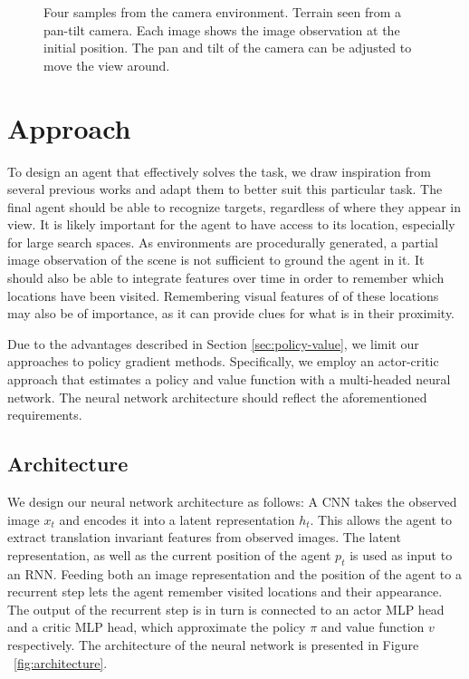 \begin{figure}
    \centering
    
    \caption[Camera environment]{Four samples from the camera environment. Terrain seen from a pan-tilt camera. Each image shows the image observation at the initial position. The pan and tilt of the camera can be adjusted to move the view around.}
    \label{fig:camera}
\end{figure}

\section{Approach}
\label{sec:approach}

To design an agent that effectively solves the task, we draw inspiration from several previous works and adapt them to better suit this particular task.
The final agent should be able to recognize targets, regardless of where they appear in view.
It is likely important for the agent to have access to its location, especially for large search spaces.
As environments are procedurally generated, a partial image observation of the scene is not sufficient to ground the agent in it.
It should also be able to integrate features over time in order to remember which locations have been visited.
Remembering visual features of of these locations may also be of importance, as it can provide clues for what is in their proximity.

Due to the advantages described in Section \ref{sec:policy-value}, we limit our approaches to policy gradient methods.
Specifically, we employ an actor-critic approach that estimates a policy and value function with a multi-headed neural network.
The neural network architecture should reflect the aforementioned requirements.

\subsection{Architecture}

We design our neural network architecture as follows:
A CNN takes the observed image \(x_t\) and encodes it into a latent representation \(h_t\).
This allows the agent to extract translation invariant features from observed images.
The latent representation, as well as the current position of the agent \(p_t\) is used as input to an RNN.
Feeding both an image representation and the position of the agent to a recurrent step lets the agent remember visited locations and their appearance.
The output of the recurrent step is in turn is connected to an actor MLP head and a critic MLP head, which approximate the policy \(\pi\) and value function \(v\) respectively.
The architecture of the neural network is presented in Figure ~\ref{fig:architecture}.

